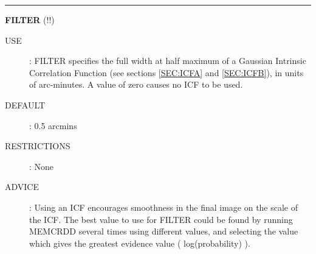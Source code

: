 \rule{\textwidth}{0.3mm}
{\Large {\bf FILTER} (!!)}
\begin{description}
\item [USE]:
FILTER specifies the full width at half maximum of a Gaussian Intrinsic
Correlation Function (see sections \ref {SEC:ICFA} and \ref {SEC:ICFB}), in
units of arc-minutes. A value of zero causes no ICF to be used.
\item [DEFAULT]:
0.5 arcmins
\item [RESTRICTIONS]:
None
\item [ADVICE]:
Using an ICF encourages smoothness in the final image on the scale of the ICF.
The best value to use for FILTER could be found by running MEMCRDD several times
using different values, and selecting the value which gives the greatest
evidence value ( log(probability) ).
\end {description}

